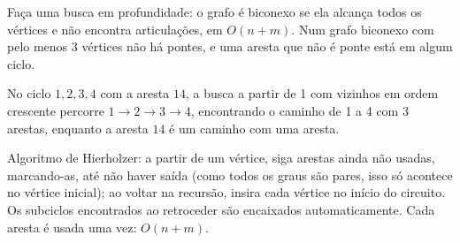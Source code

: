  Faça uma busca em profundidade: o grafo é biconexo se ela alcança todos os vértices e não encontra articulações, em $O(n+m)$. Num grafo biconexo com pelo menos 3 vértices não há pontes, e uma aresta que não é ponte está em algum ciclo.

 No ciclo $1,2,3,4$ com a aresta $14$, a busca a partir de 1 com vizinhos em ordem crescente percorre $1\to2\to3\to4$, encontrando o caminho de 1 a 4 com 3 arestas, enquanto a aresta $14$ é um caminho com uma aresta.

 Algoritmo de Hierholzer: a partir de um vértice, siga arestas ainda não usadas, marcando-as, até não haver saída (como todos os graus são pares, isso só acontece no vértice inicial); ao voltar na recursão, insira cada vértice no início do circuito. Os subciclos encontrados ao retroceder são encaixados automaticamente. Cada aresta é usada uma vez: $O(n+m)$.
